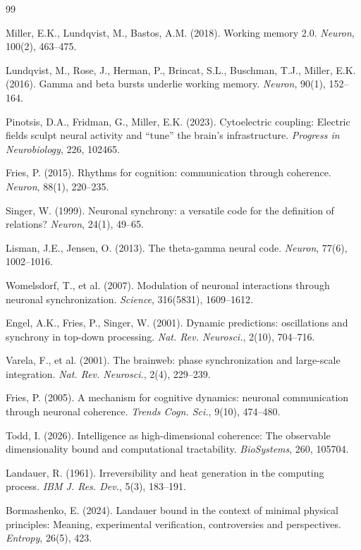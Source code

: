 \documentclass[12pt]{article}
\begin{document}
\begin{thebibliography}{99}

Miller, E.K., Lundqvist, M., Bastos, A.M. (2018). Working memory 2.0. \textit{Neuron}, 100(2), 463--475.

Lundqvist, M., Rose, J., Herman, P., Brincat, S.L., Buschman, T.J., Miller, E.K. (2016). Gamma and beta bursts underlie working memory. \textit{Neuron}, 90(1), 152--164.

Pinotsis, D.A., Fridman, G., Miller, E.K. (2023). Cytoelectric coupling: Electric fields sculpt neural activity and ``tune'' the brain's infrastructure. \textit{Progress in Neurobiology}, 226, 102465.

Fries, P. (2015). Rhythms for cognition: communication through coherence. \textit{Neuron}, 88(1), 220--235.

Singer, W. (1999). Neuronal synchrony: a versatile code for the definition of relations? \textit{Neuron}, 24(1), 49--65.

Lisman, J.E., Jensen, O. (2013). The theta-gamma neural code. \textit{Neuron}, 77(6), 1002--1016.

Womelsdorf, T., et al. (2007). Modulation of neuronal interactions through neuronal synchronization. \textit{Science}, 316(5831), 1609--1612.

Engel, A.K., Fries, P., Singer, W. (2001). Dynamic predictions: oscillations and synchrony in top-down processing. \textit{Nat. Rev. Neurosci.}, 2(10), 704--716.

Varela, F., et al. (2001). The brainweb: phase synchronization and large-scale integration. \textit{Nat. Rev. Neurosci.}, 2(4), 229--239.

Fries, P. (2005). A mechanism for cognitive dynamics: neuronal communication through neuronal coherence. \textit{Trends Cogn. Sci.}, 9(10), 474--480.

Todd, I. (2026). Intelligence as high-dimensional coherence: The observable dimensionality bound and computational tractability. \textit{BioSystems}, 260, 105704.

Landauer, R. (1961). Irreversibility and heat generation in the computing process. \textit{IBM J. Res. Dev.}, 5(3), 183--191.

Bormashenko, E. (2024). Landauer bound in the context of minimal physical principles: Meaning, experimental verification, controversies and perspectives. \textit{Entropy}, 26(5), 423.


\end{thebibliography}
\end{document}
